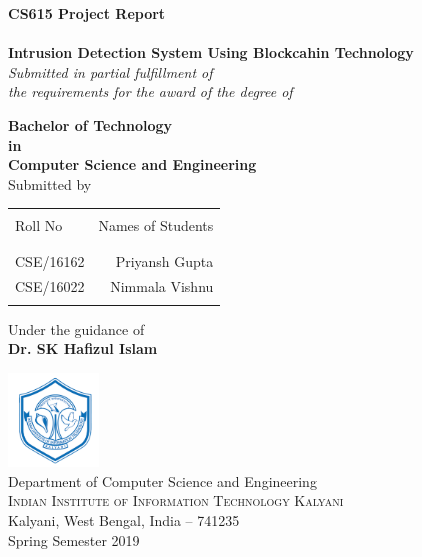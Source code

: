 \begin{titlepage}

\begin{center}

\textup{\small {\bf CS615 Project Report}\\}\\[0.2in]

\Large \textbf {Intrusion Detection System Using Blockcahin Technology}\\[0.5in]

       \small \emph{Submitted in partial fulfillment of\\
        the requirements for the award of the degree of}
        \vspace{.2in}

       {\bf Bachelor of Technology \\in\\ Computer Science and Engineering}\\[0.5in]

\normalsize Submitted by \\
\begin{table}[h]
\centering
\begin{tabular}{lr}\hline \\
Roll No & Names of Students \\ \\ \hline
\\
CSE/16162 & Priyansh Gupta \\ 
CSE/16022 & Nimmala Vishnu \\
 \\ \hline 
\end{tabular}
\end{table}

\vspace{.1in}
Under the guidance of\\
{\textbf{Dr. SK Hafizul Islam}}\\[0.2in]

\vfill

\includegraphics[width=0.18\textwidth]{./iiik}\\[0.1in]
\Large{Department of Computer Science and Engineering}\\
\normalsize
\textsc{Indian Institute of Information Technology Kalyani}\\
Kalyani, West Bengal, India -- 741235 \\
\vspace{0.2cm}
Spring Semester 2019

\end{center}

\end{titlepage}
